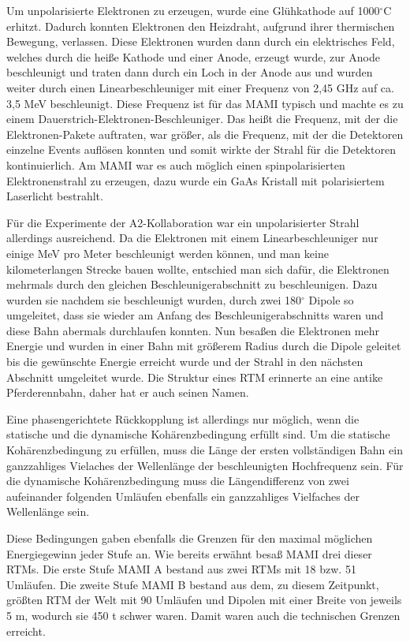 \documentclass[a4paper,11pt,oneside,final,german,openbib,pdftex]{scrbook}
\begin{document}
{Um unpolarisierte Elektronen zu erzeugen, wurde eine Glühkathode auf 1000$^{\circ}$C erhitzt. Dadurch konnten Elektronen den Heizdraht, aufgrund ihrer thermischen Bewegung, verlassen. Diese Elektronen wurden dann durch ein elektrisches Feld, welches durch die heiße Kathode und einer Anode, erzeugt wurde, zur Anode beschleunigt und traten dann durch ein Loch in der Anode aus und wurden weiter durch einen Linearbeschleuniger mit einer Frequenz von 2,45 GHz auf ca. 3,5 MeV beschleunigt. Diese Frequenz ist für das MAMI typisch und machte es zu einem Dauerstrich-Elektronen-Beschleuniger. Das heißt die Frequenz, mit der die Elektronen-Pakete auftraten, war größer, als die Frequenz, mit der die Detektoren einzelne Events auflösen konnten und somit wirkte der Strahl für die Detektoren kontinuierlich.
Am MAMI war es auch m\"oglich einen spinpolarisierten Elektronenstrahl zu erzeugen, dazu wurde ein GaAs Kristall mit polarisiertem Laserlicht bestrahlt. 

F\"ur die Experimente der A2-Kollaboration war ein unpolarisierter Strahl allerdings ausreichend.
\newline
Da die Elektronen mit einem Linearbeschleuniger nur einige MeV pro Meter beschleunigt werden k\"onnen, und man keine kilometerlangen Strecke bauen wollte, entschied man sich daf\"ur, die Elektronen mehrmals durch den gleichen Beschleunigerabschnitt zu beschleunigen. Dazu wurden sie nachdem sie beschleunigt wurden, durch zwei 180$^{\circ}$ Dipole so umgeleitet, dass sie wieder am Anfang des Beschleunigerabschnitts waren und diese Bahn abermals durchlaufen konnten. Nun besa{\ss}en die Elektronen mehr Energie und wurden in einer Bahn mit gr\"o{\ss}erem Radius durch die Dipole geleitet bis die gew\"unschte Energie erreicht wurde und der Strahl in den n\"achsten Abschnitt umgeleitet wurde. Die Struktur eines RTM erinnerte an eine antike Pferderennbahn, daher hat er auch seinen Namen.

 Eine phasengerichtete R\"uckkopplung ist allerdings nur m\"oglich, wenn die statische und die dynamische Koh\"arenzbedingung erf\"ullt sind. Um die statische Koh\"arenzbedingung zu erf\"ullen, muss die L\"ange der ersten vollst\"andigen Bahn ein ganzzahliges Vielaches der Wellenl\"ange der beschleunigten Hochfrequenz sein. F\"ur die dynamische Koh\"arenzbedingung muss die L\"angendifferenz von zwei aufeinander folgenden Uml\"aufen ebenfalls ein ganzzahliges Vielfaches der Wellenl\"ange sein\cite{Un08}. 
 
 Diese Bedingungen gaben ebenfalls die Grenzen f\"ur den maximal m\"oglichen Energiegewinn jeder Stufe an. 
\newline
Wie bereits erw\"ahnt besa{\ss} MAMI drei dieser RTMs. Die erste Stufe MAMI A bestand aus zwei RTMs mit 18 bzw. 51 Uml\"aufen. Die zweite Stufe MAMI B bestand aus dem, zu diesem Zeitpunkt, gr\"o{\ss}ten RTM der Welt mit 90 Uml\"aufen und Dipolen mit einer Breite von jeweils 5 m, wodurch sie 450 t schwer waren. Damit waren auch die technischen Grenzen erreicht.\cite{KPh11F}


}
\end{document}
